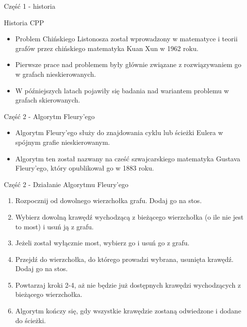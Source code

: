\documentclass[polish,envcountsect,10pt]{beamer}
\begin{document}
\begin{frame}{Część 1 - historia}
    \begin{block}{Historia CPP}
        \begin{itemize}
            \item Problem Chińskiego Listonosza został wprowadzony w matematyce i teorii grafów przez chińskiego matematyka Kuan Xun w 1962 roku.
            \item Pierwsze prace nad problemem były głównie związane z rozwiązywaniem go w grafach nieskierowanych.
            \item W późniejszych latach pojawiły się badania nad wariantem problemu w grafach skierowanych.
        \end{itemize}
    \end{block}
\end{frame}

\begin{frame}{Część 2 - Algorytm Fleury'ego}
    \begin{itemize}
      \item Algorytm Fleury'ego służy do znajdowania cyklu lub ścieżki Eulera w spójnym grafie nieskierowanym.
      \item Algorytm ten został nazwany na cześć szwajcarskiego matematyka Gustava Fleury'ego, który opublikował go w 1883 roku.
    \end{itemize}
\end{frame}

\begin{frame}{Część 2 - Działanie Algorytmu Fleury'ego}
    \begin{enumerate}
        \item Rozpocznij od dowolnego wierzchołka grafu. Dodaj go na stos.
        \item Wybierz dowolną krawędź wychodzącą z bieżącego wierzchołka (o ile nie jest to most)  i usuń ją z grafu.
        \item Jeżeli został wyłącznie most, wybierz go i usuń go z grafu.
        \item Przejdź do wierzchołka, do którego prowadzi wybrana, usunięta krawędź. Dodaj go na stos.
        \item Powtarzaj kroki 2-4, aż nie będzie już dostępnych krawędzi wychodzących z bieżącego wierzchołka.
        \item Algorytm kończy się, gdy wszystkie krawędzie zostaną odwiedzone i dodane do ścieżki.
    \end{enumerate}
\end{frame}
\end{document}
